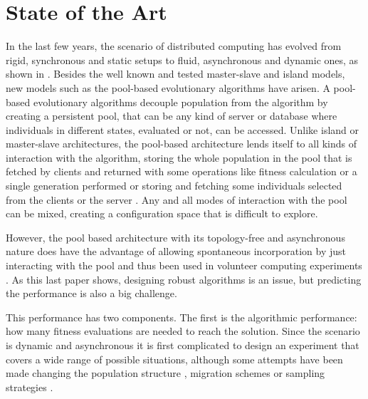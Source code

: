 \documentclass[runningheads,a4paper]{llncs}
\begin{document}

\section{State of the Art}
\label{sec:sota}

In the last few years, the scenario of distributed computing has
evolved from rigid, synchronous and static setups to fluid, asynchronous and dynamic ones, as
shown in \cite{gong2015distributed}. Besides the well known and tested
master-slave and island models, new models such as the pool-based
evolutionary algorithms
\cite{roy2009distributed,bollini1999distributed,sofea:evopar2012,sofea:naco}
have arisen. A pool-based evolutionary algorithms decouple population
from the algorithm by creating a persistent pool, that can be any kind
of server or database where individuals in different states, evaluated
or not, can be accessed. Unlike island or master-slave architectures,
the pool-based architecture lends itself to all kinds of interaction
with the algorithm, storing the whole population in the pool that is
fetched by clients and returned with some operations like fitness
calculation or a single generation performed
\cite{nogueras2015self,garcia2014unreliable} or storing and fetching some
individuals selected from the clients or the server
\cite{DBLP:conf/3pgcic/GuervosMFEL12}. Any and all modes of
interaction with the pool can be mixed, creating a configuration space
that is difficult to explore.

However, the pool based architecture with its topology-free and
asynchronous nature does have the advantage of
allowing spontaneous incorporation by just interacting with the pool
and thus been used in volunteer computing experiments
\cite{daniel:euromicro09,DBLP:journals/corr/abs-0801-1210,DBLP:journals/gpem/LaredoBGVAGF14}. As
this last paper shows, designing robust algorithms is an issue, but
predicting the performance is also a big challenge.

This performance has two components. The first is the algorithmic
performance: how many fitness evaluations are needed to reach the
solution. Since the scenario is dynamic and asynchronous it is first
complicated to design an experiment that covers a wide range of
possible situations, although some attempts have been made changing
the population structure \cite{DBLP:conf/lion/LaredoGFMACG11},
migration schemes \cite{hijaze2014investigating} or sampling
strategies \cite{nogueras2015self}. 
\end{document}
